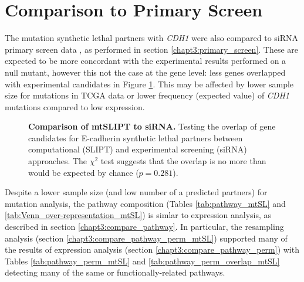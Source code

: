 \clearpage
\section{Comparison to Primary Screen}

The mutation synthetic lethal partners with \textit{CDH1} were also compared to siRNA primary screen data \citep{Telford2015}, as performed in section \ref{chapt3:primary_screen}. These are expected to be more concordant with the experimental results performed on a null mutant, however this not the case at the gene level: less genes overlapped with experimental candidates in Figure \ref{fig:Venn_allgenes_mtSL}. This may be affected by lower sample size for mutations in TCGA data or lower frequency (expected value) of \textit{CDH1} mutations compared to low expression. 

\begin{figure}[!ht]
\begin{mdframed}
  \centering
    \caption[Comparison of mtSLIPT to siRNA]{\small \textbf{Comparison of mtSLIPT to siRNA.} Testing the overlap of gene candidates for E-cadherin synthetic lethal partners between computational (SLIPT) and experimental screening (siRNA) approaches. The $\chi^2$ test suggests that the overlap is no more than would be expected by chance ($p = 0.281$). %
}
\label{fig:Venn_allgenes_mtSL}
\end{mdframed}
\end{figure}

\FloatBarrier

Despite a lower sample size (and low number of a predicted partners) for mutation analysis, the pathway composition (Tables \ref{tab:pathway_mtSL} and \ref{tab:Venn_over-representation_mtSL}) is simlar to expression analysis, as described in section \ref{chapt3:compare_pathway}. In particular, the resampling analysis (section \ref{chapt3:compare_pathway_perm_mtSL}) supported many of the results of expression analysis (section \ref{chapt3:compare_pathway_perm}) with Tables \ref{tab:pathway_perm_mtSL} and \ref{tab:pathway_perm_overlap_mtSL} detecting many of the same or functionally-related pathways.
 

